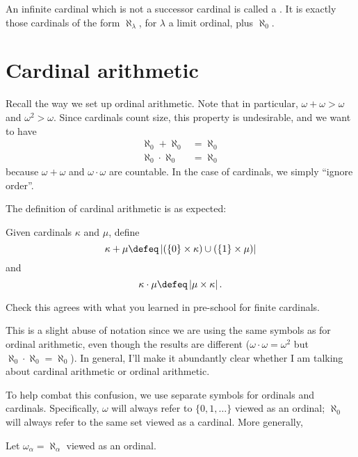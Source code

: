 \begin{definition}
	An infinite cardinal which is not a successor cardinal
	is called a .
	It is exactly those cardinals of the form $\aleph_\lambda$,
	for $\lambda$ a limit ordinal, plus $\aleph_0$.
\end{definition}


\section{Cardinal arithmetic}
Recall the way we set up ordinal arithmetic.
Note that in particular, $\omega + \omega > \omega$ and $\omega^2 > \omega$.
Since cardinals count size, this property is undesirable, and
we want to have
\begin{align*}
	\aleph_0 + \aleph_0 &= \aleph_0 \\
	\aleph_0 \cdot \aleph_0 &= \aleph_0
\end{align*}
because $\omega + \omega$ and $\omega \cdot \omega$ are countable.
In the case of cardinals, we simply ``ignore order''.

The definition of cardinal arithmetic is as expected:
\begin{definition}
	Given cardinals $\kappa$ and $\mu$, define
	\[ \kappa + \mu
		\defeq
		\left\lvert
		\left( \left\{ 0 \right\} \times \kappa \right)
		\cup
		\left( \left\{ 1 \right\} \times \mu \right)
		\right\rvert
	\]
	and
	\[
		\kappa \cdot \mu
		\defeq
		\left\lvert \mu \times \kappa \right\rvert
		.
	\]
\end{definition}


\begin{ques}
	Check this agrees with what you learned in pre-school
	for finite cardinals.
\end{ques}

\begin{abuse}
	This is a slight abuse of notation since we are using
	the same symbols as for ordinal arithmetic,
	even though the results are different ($\omega \cdot \omega = \omega^2$
	but $\aleph_0 \cdot \aleph_0 = \aleph_0$).
	In general, I'll make it abundantly clear whether I am talking
	about cardinal arithmetic or ordinal arithmetic.
\end{abuse}
To help combat this confusion, we use separate symbols for ordinals and cardinals.
Specifically, $\omega$ will always refer to $\{0,1,\dots\}$ viewed as an ordinal;
$\aleph_0$ will always refer to the same set viewed as a cardinal.
More generally,
\begin{definition}
	Let $\omega_\alpha = \aleph_\alpha$ viewed as an ordinal.
\end{definition}

